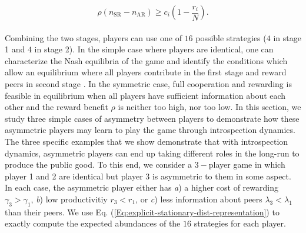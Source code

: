 \documentclass[11pt]{article}
\theoremstyle{plainCl1}
\theoremstyle{plainCl2}
\begin{document}
\begin{equation}
\rho(n_{\mathrm{SR}} - n_{\mathrm{AR}}) \geq c_i \left( 1 - \frac{r_i}{N} \right) .
\label{Eq:palrewardsequation}
\end{equation}
\\
\noindent Combining the two stages, players can use one of $16$ possible strategies ($4$ in stage 1 and $4$ in stage 2). In the simple case where players are identical, one can characterize the Nash equilibria of the game and identify the conditions which allow an equilibrium where all players contribute in the first stage and reward peers in second stage \cite{Pal:NatCom:2022}. In the symmetric case, full cooperation and rewarding is feasible in equilibrium when all players have sufficient information about each other and the reward benefit $\rho$ is neither too high, nor too low. In this section, we study three simple cases of asymmetry between players to demonstrate how these asymmetric players may learn to play the game through introspection dynamics. The three specific examples that we show demonstrate that with introspection dynamics, asymmetric players can end up taking different roles in the long-run to produce the public good. To this end, we consider a $3-$player game in which player 1 and 2 are identical but player 3 is asymmetric to them in some aspect. In each case, the asymmetric player either has \textit{a}) a higher cost of rewarding $\gamma_3 > \gamma_1$, \textit{b}) low productivitiy  $r_3 < r_1$, or \textit{c}) less information about peers $\lambda_3 < \lambda_1$ than their peers. We use Eq. (\ref{Eq:explicit-stationary-dist-representation}) to exactly compute the expected abundances of the $16$ strategies for each player. 
\\ \\
\end{document}

